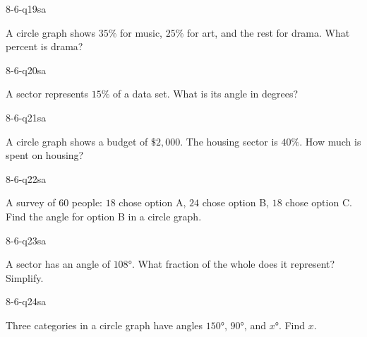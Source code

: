 
\begin{practiceQuestion}{8-6-q19}{sa}
\begin{questionText}
A circle graph shows $35\%$ for music, $25\%$ for art, and the rest for drama. What percent is drama?
\end{questionText}
\end{practiceQuestion}

\begin{practiceQuestion}{8-6-q20}{sa}
\begin{questionText}
A sector represents $15\%$ of a data set. What is its angle in degrees?
\end{questionText}
\end{practiceQuestion}

\begin{practiceQuestion}{8-6-q21}{sa}
\begin{questionText}
A circle graph shows a budget of $\$2{,}000$. The housing sector is $40\%$. How much is spent on housing?
\end{questionText}
\end{practiceQuestion}

\begin{practiceQuestion}{8-6-q22}{sa}
\begin{questionText}
A survey of $60$ people: $18$ chose option A, $24$ chose option B, $18$ chose option C. Find the angle for option B in a circle graph.
\end{questionText}
\end{practiceQuestion}

\begin{practiceQuestion}{8-6-q23}{sa}
\begin{questionText}
A sector has an angle of $108°$. What fraction of the whole does it represent? Simplify.
\end{questionText}
\end{practiceQuestion}

\begin{practiceQuestion}{8-6-q24}{sa}
\begin{questionText}
Three categories in a circle graph have angles $150°$, $90°$, and $x°$. Find $x$.
\end{questionText}
\end{practiceQuestion}

